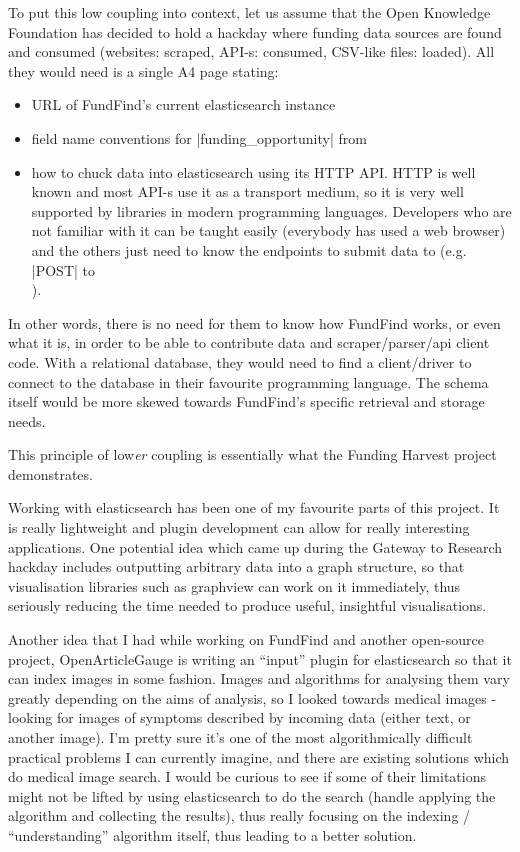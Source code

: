 To put this low coupling into context, let us assume that the Open Knowledge Foundation has decided to hold a hackday where funding data sources are found and consumed (websites: scraped, API-s: consumed, CSV-like files: loaded). All they would need is a single A4 page stating:
\begin{itemize}
\item URL of FundFind's current elasticsearch instance
\item field name conventions for |funding_opportunity| from 
\item how to chuck data into elasticsearch using its HTTP API. HTTP is well known and most API-s use it as a transport medium, so it is very well supported by libraries in modern programming languages. Developers who are not familiar with it can be taught easily (everybody has used a web browser) and the others just need to know the endpoints to submit data to (e.g. |POST| to \\ ).
\end{itemize}

In other words, there is no need for them to know how FundFind works, or even what it is, in order to be able to contribute data and scraper/parser/api client code. With a relational database, they would need to find a client/driver to connect to the database in their favourite programming language. The schema itself would be more skewed towards FundFind's specific retrieval and storage needs.

This principle of low\emph{er} coupling is essentially what the Funding Harvest project demonstrates.

Working with elasticsearch has been one of my favourite parts of this project. It is really lightweight and plugin development can allow for really interesting applications. One potential idea which came up during the Gateway to Research hackday includes outputting arbitrary data into a graph structure, so that visualisation libraries such as graphview \cite{graphview} can work on it immediately, thus seriously reducing the time needed to produce useful, insightful visualisations.

Another idea that I had while working on FundFind and another open-source project, OpenArticleGauge \cite{oag} is writing an ``input'' plugin for elasticsearch so that it can index images in some fashion. Images and algorithms for analysing them vary greatly depending on the aims of analysis, so I looked towards medical images - looking for images of symptoms described by incoming data (either text, or another image). I'm pretty sure it's one of the most algorithmically difficult practical problems I can currently imagine, and there are existing solutions which do medical image search. I would be curious to see if some of their limitations might not be lifted by using elasticsearch to do the search (handle applying the algorithm and collecting the results), thus really focusing on the indexing / ``understanding'' algorithm itself, thus leading to a better solution.

